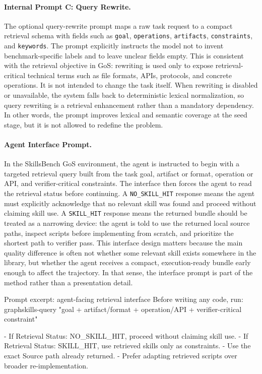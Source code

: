 \paragraph{Internal Prompt C: Query Rewrite.}
The optional query-rewrite prompt maps a raw task request to a compact retrieval schema with fields such as \texttt{goal}, \texttt{operations}, \texttt{artifacts}, \texttt{constraints}, and \texttt{keywords}. The prompt explicitly instructs the model not to invent benchmark-specific labels and to leave unclear fields empty. This is consistent with the retrieval objective in GoS: rewriting is used only to expose retrieval-critical technical terms such as file formats, APIs, protocols, and concrete operations. It is not intended to change the task itself. When rewriting is disabled or unavailable, the system falls back to deterministic lexical normalization, so query rewriting is a retrieval enhancement rather than a mandatory dependency. In other words, the prompt improves lexical and semantic coverage at the seed stage, but it is not allowed to redefine the problem.

\paragraph{Agent Interface Prompt.}
In the SkillsBench GoS environment, the agent is instructed to begin with a targeted retrieval query built from the task goal, artifact or format, operation or API, and verifier-critical constraints. The interface then forces the agent to read the retrieval status before continuing. A \texttt{NO\_SKILL\_HIT} response means the agent must explicitly acknowledge that no relevant skill was found and proceed without claiming skill use. A \texttt{SKILL\_HIT} response means the returned bundle should be treated as a narrowing device: the agent is told to use the returned local source paths, inspect scripts before implementing from scratch, and prioritize the shortest path to verifier pass. This interface design matters because the main quality difference is often not whether some relevant skill exists somewhere in the library, but whether the agent receives a compact, execution-ready bundle early enough to affect the trajectory. In that sense, the interface prompt is part of the method rather than a presentation detail.

\begin{GosPromptBox}{Prompt excerpt: agent-facing retrieval interface}
Before writing any code, run:
graphskills-query "goal + artifact/format + operation/API +
verifier-critical constraint"

- If Retrieval Status: NO_SKILL_HIT, proceed without claiming skill use.
- If Retrieval Status: SKILL_HIT, use retrieved skills only as constraints.
- Use the exact Source path already returned.
- Prefer adapting retrieved scripts over broader re-implementation.
\end{GosPromptBox}

